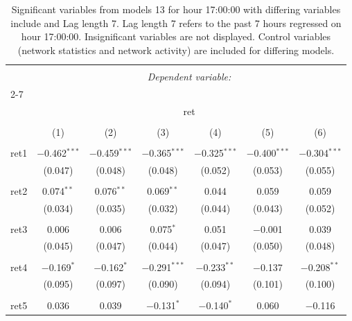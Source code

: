 
\begin{table}[!htbp] \centering 
  \caption{Significant variables from models 13 for hour 17:00:00 with differing variables include 
                               and Lag length 7. Lag length 7 refers to the past 7 hours regressed on hour 17:00:00. 
                               Insignificant variables are not displayed. 
                               Control variables (network statistics and network activity) are 
                               included for differing models.} 
  \label{RVmodels1_t_hourlagged4} 
\scriptsize 
\begin{tabular}{@{\extracolsep{5pt}}lcccccc} 
\\[-1.8ex]\hline 
\hline \\[-1.8ex] 
 & \multicolumn{6}{c}{\textit{Dependent variable:}} \\ 
\cline{2-7} 
\\[-1.8ex] & \multicolumn{6}{c}{ret} \\ 
\\[-1.8ex] & (1) & (2) & (3) & (4) & (5) & (6)\\ 
\hline \\[-1.8ex] 
 ret1 & $-$0.462$^{***}$ & $-$0.459$^{***}$ & $-$0.365$^{***}$ & $-$0.325$^{***}$ & $-$0.400$^{***}$ & $-$0.304$^{***}$ \\ 
  & (0.047) & (0.048) & (0.048) & (0.052) & (0.053) & (0.055) \\ 
  & & & & & & \\ 
 ret2 & 0.074$^{**}$ & 0.076$^{**}$ & 0.069$^{**}$ & 0.044 & 0.059 & 0.059 \\ 
  & (0.034) & (0.035) & (0.032) & (0.044) & (0.043) & (0.052) \\ 
  & & & & & & \\ 
 ret3 & 0.006 & 0.006 & 0.075$^{*}$ & 0.051 & $-$0.001 & 0.039 \\ 
  & (0.045) & (0.047) & (0.044) & (0.047) & (0.050) & (0.048) \\ 
  & & & & & & \\ 
 ret4 & $-$0.169$^{*}$ & $-$0.162$^{*}$ & $-$0.291$^{***}$ & $-$0.233$^{**}$ & $-$0.137 & $-$0.208$^{**}$ \\ 
  & (0.095) & (0.097) & (0.090) & (0.094) & (0.101) & (0.100) \\ 
  & & & & & & \\ 
 ret5 & 0.036 & 0.039 & $-$0.131$^{*}$ & $-$0.140$^{*}$ & 0.060 & $-$0.116 \\ 

\end{tabular}
\end{table}
